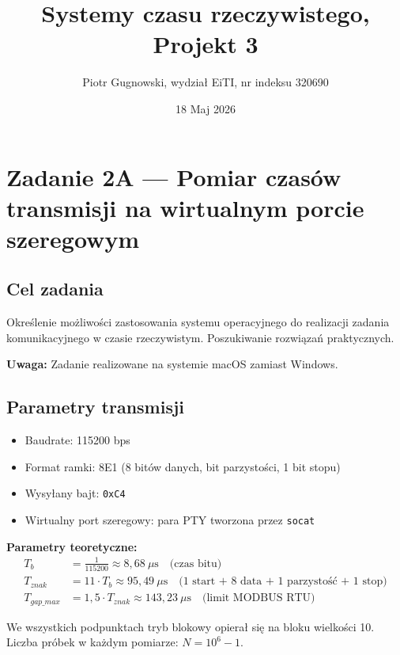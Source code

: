 \documentclass[12pt,a4paper]{article}
\title{Systemy czasu rzeczywistego, Projekt 3}
\author{Piotr Gugnowski, wydział EiTI, nr indeksu 320690}
\date{18 Maj 2026}
\begin{document}
\maketitle

\section*{Zadanie 2A — Pomiar czasów transmisji na wirtualnym porcie szeregowym}

\subsection*{Cel zadania}

Określenie możliwości zastosowania systemu operacyjnego do realizacji zadania
komunikacyjnego w czasie rzeczywistym. Poszukiwanie rozwiązań praktycznych.

\textbf{Uwaga:} Zadanie realizowane na systemie macOS zamiast Windows.

\subsection*{Parametry transmisji}

\begin{itemize}
    \item Baudrate: 115200 bps
    \item Format ramki: 8E1 (8 bitów danych, bit parzystości, 1 bit stopu)
    \item Wysyłany bajt: \texttt{0xC4}
    \item Wirtualny port szeregowy: para PTY tworzona przez \texttt{socat}
\end{itemize}

\textbf{Parametry teoretyczne:}
\begin{align*}
T_b &= \frac{1}{115200} \approx 8{,}68\ \mu\text{s} \quad \text{(czas bitu)} \\
T_{znak} &= 11 \cdot T_b \approx 95{,}49\ \mu\text{s} \quad \text{(1 start + 8 data + 1 parzystość + 1 stop)} \\
T_{gap\_max} &= 1{,}5 \cdot T_{znak} \approx 143{,}23\ \mu\text{s} \quad \text{(limit MODBUS RTU)}
\end{align*}

We wszystkich podpunktach tryb blokowy opierał się na bloku wielkości 10.
Liczba próbek w każdym pomiarze: $N = 10^6 - 1$.

\end{document}
